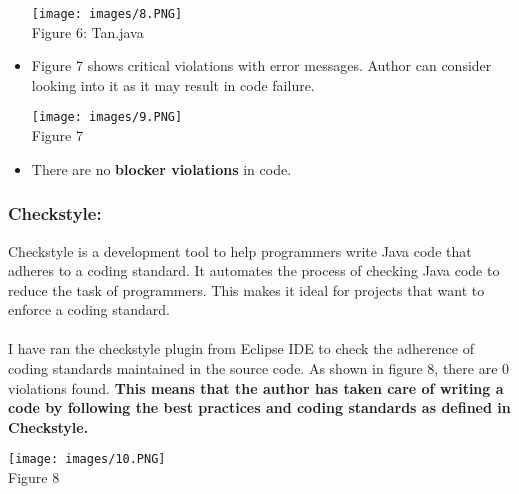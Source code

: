 \documentclass[10pt,letterpaper]{article}
\begin{document}
\begin{itemize}
    \begin{center}
    \texttt{[image: images/8.PNG]}\\
    \caption{Figure 6: Tan.java}
\end{center}
\item Figure 7 shows critical violations with error messages. Author can consider looking into it as it may result in code failure.
    \begin{center}
    \texttt{[image: images/9.PNG]}\\
    \caption{Figure 7}
    \end{center}
\item There are no \textbf{blocker violations} in code.
\end{itemize}
\subsubsection{Checkstyle:}
Checkstyle is a development tool to help programmers write Java code that adheres to a coding standard. It automates the process of checking Java code to reduce the task of programmers. This makes it ideal for projects that want to enforce a coding standard. \cite{Sourceforge}
\\\\
I have ran the checkstyle plugin from Eclipse IDE to check the adherence of coding standards maintained in the source code. As shown in figure 8, there are 0 violations found. \textbf{This means that the author has taken care of writing a code by following the best practices and coding standards as defined in Checkstyle.}  
\begin{center}
    \texttt{[image: images/10.PNG]}\\
    \caption{Figure 8}
\end{center}

\newpage
\end{document}
